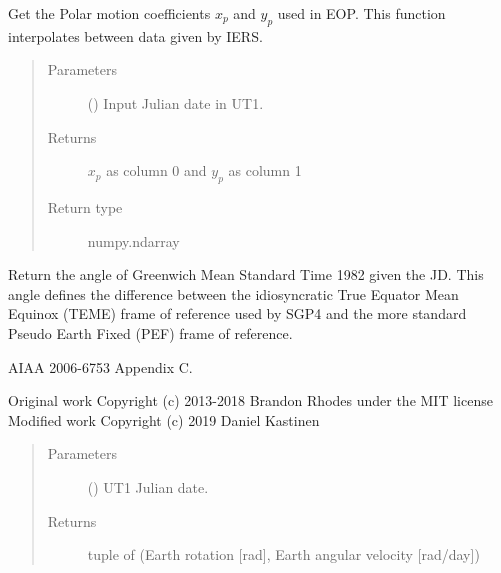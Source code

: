 \documentclass[letterpaper,10pt,english]{sphinxmanual}
\begin{document}

\begin{fulllineitems}
\label{\detokenize{modules/TLE_tools:TLE_tools.get_Polar_Motion}}
Get the Polar motion coefficients \(x_p\) and \(y_p\) used in EOP. This function interpolates between data given by IERS.
\begin{quote}\begin{description}
\item[{Parameters}] \leavevmode
{} () \textendash{} Input Julian date in UT1.

\item[{Returns}] \leavevmode
\(x_p\) as column 0 and \(y_p\) as column 1

\item[{Return type}] \leavevmode
numpy.ndarray

\end{description}\end{quote}

\end{fulllineitems}


\begin{fulllineitems}
\label{\detokenize{modules/TLE_tools:TLE_tools.theta_GMST1982}}
Return the angle of Greenwich Mean Standard Time 1982 given the JD.
This angle defines the difference between the idiosyncratic True
Equator Mean Equinox (TEME) frame of reference used by SGP4 and the
more standard Pseudo Earth Fixed (PEF) frame of reference.

 AIAA 2006-6753 Appendix C.

Original work Copyright (c) 2013-2018 Brandon Rhodes under the MIT license
Modified work Copyright (c) 2019 Daniel Kastinen
\begin{quote}\begin{description}
\item[{Parameters}] \leavevmode
{} () \textendash{} UT1 Julian date.

\item[{Returns}] \leavevmode
tuple of (Earth rotation {[}rad{]}, Earth angular velocity {[}rad/day{]})

\end{description}\end{quote}

\end{fulllineitems}
\end{document}
